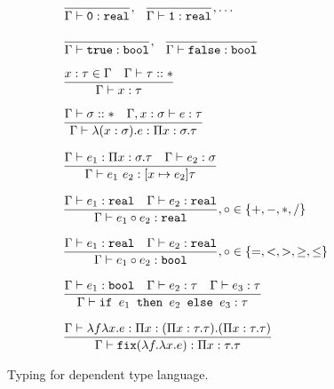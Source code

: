 \begin{figure}
\[
\begin{array}{lr}
 \\ \\
\dfrac{}{\Gamma \vdash \texttt{0}: \texttt{real}}, \ \ \dfrac{}{\Gamma \vdash \texttt{1}: \texttt{real}}, \ldots \\ \\
\dfrac{}{\Gamma \vdash \texttt{true} : \texttt{bool}}, \ \ \dfrac{}{\Gamma \vdash \texttt{false} : \texttt{bool}} \\  \\
\dfrac{x : \tau \in \Gamma \ \ \ \Gamma \vdash \tau :: *}{\Gamma \vdash x : \tau } \\ \\ 
\dfrac{\Gamma \vdash \sigma :: * \ \ \ \Gamma, x : \sigma \vdash e : \tau}
	{\Gamma \vdash \lambda (x : \sigma).e : \Pi x:\sigma.\tau } \\ \\
\dfrac{\Gamma \vdash e_1: \Pi x:\sigma.\tau \ \ \ \Gamma \vdash e_2 : \sigma}
	{\Gamma \vdash e_1 \ e_2 : [x \mapsto e_2]\tau} \\ \\
\dfrac{\Gamma \vdash e_1 : \texttt{real} \ \ \ \Gamma \vdash e_2 : \texttt{real}}
	{\Gamma \vdash e_1 \circ e_2 : \texttt{real}}
, \circ \in \{+,-,*,/\} \\ \\ 
\dfrac{\Gamma \vdash e_1 : \texttt{real} \ \ \ \Gamma \vdash e_2 : \texttt{real}}
	{\Gamma \vdash e_1 \circ e_2 : \texttt{bool}}
	, \circ \in \{=, <, >, \geq, \leq\} \\ \\ 
\dfrac{\Gamma \vdash e_1 : \texttt{bool} \ \ \ \Gamma \vdash e_2 : \tau \ \ \ \Gamma \vdash e_3 : \tau}
	{\Gamma \vdash \ifelse{e_1}{e_2}{e_3} : \tau} \\ \\ 
\dfrac{\Gamma \vdash \lambda f \lambda x.e : \Pi x:(\Pi x:\tau.\tau).(\Pi x:\tau.\tau)}
	{\Gamma \vdash \texttt{fix}(\lambda f. \lambda x.e) : \Pi x:\tau.\tau}
\end{array}
\]
\caption{Typing for dependent type language.}
\end{figure}


